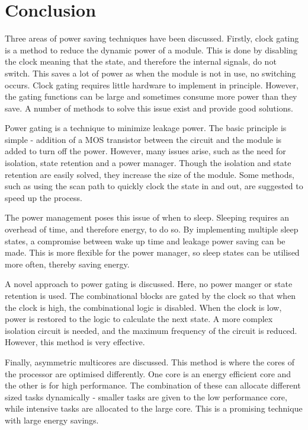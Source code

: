 
\section{Conclusion}

Three areas of power saving techniques have been discussed. 
Firstly, clock gating is a method to reduce the dynamic power of a module. 
This is done by disabling the clock meaning that the state, and therefore the internal signals, do not switch. 
This saves a lot of power as when the module is not in use, no switching occurs. 
Clock gating requires little hardware to implement in principle. 
However, the gating functions can be large and sometimes consume more power than they save. 
A number of methods to solve this issue exist and provide good solutions.


Power gating is a technique to minimize leakage power.
The basic principle is simple - addition of a MOS transistor between the circuit and the module is added to turn off the power.
However, many issues arise, such as the need for isolation, state retention and a power manager.
Though the isolation and state retention are easily solved, they increase the size of the module. 
Some methods, such as using the scan path to quickly clock the state in and out, are suggested to speed up the process. 

The power management poses this issue of when to sleep. 
Sleeping requires an overhead of time, and therefore energy, to do so. 
By implementing multiple sleep states, a compromise between wake up time and leakage power saving can be made. 
This is more flexible for the power manager, so sleep states can be utilised more often, thereby saving energy.

A novel approach to power gating is discussed. 
Here, no power manger or state retention is used. 
The combinational blocks are gated by the clock so that when the clock is high, the combinational logic is disabled. 
When the clock is low, power is restored to the logic to calculate the next state. 
A more complex isolation circuit is needed, and the maximum frequency of the circuit is reduced. 
However, this method is very effective.

Finally, asymmetric multicores are discussed.
This method is where the cores of the processor are optimised differently.
One core is an energy efficient core and the other is for high performance. 
The combination of these can allocate different sized tasks dynamically - smaller tasks are given to the low performance core, while intensive tasks are allocated to the large core.
This is a promising technique with large energy savings.


